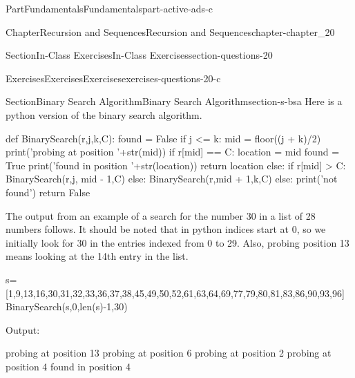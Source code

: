 \documentclass[oneside,10pt,]{book}
\numberwithin{equation}{section}
\begin{document}
\begin{partptx}{Part}{Fundamentals}{}{Fundamentals}{}{}{part-active-ads-c}
\begin{chapterptx}{Chapter}{Recursion and Sequences}{}{Recursion and Sequences}{}{}{chapter-chapter_20}
\begin{sectionptx}{Section}{In-Class Exercises}{}{In-Class Exercises}{}{}{section-questions-20}
\begin{exercises-subsection-numberless}{Exercises}{Exercises}{}{Exercises}{}{}{exercises-questions-20-c}
\end{exercises-subsection-numberless}
\end{sectionptx}
%
%
\typeout{************************************************}
\typeout{************************************************}
%
\begin{sectionptx}{Section}{Binary Search Algorithm}{}{Binary Search Algorithm}{}{}{section-s-bsa}
%
Here is a python version of the binary search algorithm.%
\begin{codedisplay}

def BinarySearch(r,j,k,C):
   found = False
   if j <= k:
      mid = floor((j + k)/2)
      print('probing at position '+str(mid))
      if r[mid] == C:
         location = mid
         found = True
         print('found in position '+str(location))
         return location
      else:
        if r[mid] > C:
           BinarySearch(r,j, mid - 1,C)
        else:
           BinarySearch(r,mid + 1,k,C)
   else:
      print('not found')
      return False      

\end{codedisplay}
The output from an example of a search for the number 30  in a list of 28 numbers follows. It should be noted that in python indices start at 0, so we initially look for 30 in the entries indexed from 0 to 29.  Also, probing position 13 means looking at the 14th entry in the list.%
\begin{codedisplay}

s=[1,9,13,16,30,31,32,33,36,37,38,45,49,50,52,61,63,64,69,77,79,80,81,83,86,90,93,96]
BinarySearch(s,0,len(s)-1,30)

\end{codedisplay}
Output:%
\begin{codedisplay}

probing at position 13
probing at position 6
probing at position 2
probing at position 4
found in position 4


\end{codedisplay}
\end{sectionptx}
\end{chapterptx}
\end{partptx}
\end{document}
